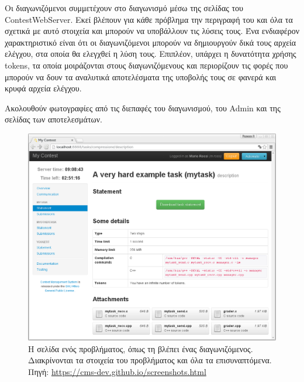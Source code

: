 \documentclass[diploma]{softlab-thesis}
\begin{document}
\bigskip

Οι διαγωνιζόμενοι συμμετέχουν στο διαγωνισμό μέσω της σελίδας του
ContestWebServer. Εκεί βλέπουν για κάθε πρόβλημα την περιγραφή του και όλα
τα σχετικά με αυτό στοιχεία και μπορούν να υποβάλλουν τις λύσεις τους. Ένα
ενδιαφέρον χαρακτηριστικό είναι ότι οι διαγωνιζόμενοι μπορούν να δημιουργούν
δικά τους αρχεία ελέγχου, στα οποία θα ελεγχθεί η λύση τους. Επιπλέον, υπάρχει
η δυνατότητα χρήσης tokens, τα οποία μοιράζονται στους διαγωνιζόμενους και
περιορίζουν τις φορές που μπορούν να δουν τα αναλυτικά αποτελέσματα της
υποβολής τους σε φανερά και κρυφά αρχεία ελέγχου.

\bigskip

Ακολουθούν φωτογραφίες από τις διεπαφές του διαγωνισμού, του Admin και της σελίδας
των αποτελεσμάτων.

\bigskip

\begin{figure}
  \centering
  \includegraphics[scale=0.4,trim=4 4 4 4,clip]{Figures/cmscontestant.png}
  \caption[Σελίδα προβλήματος CMS]{Η σελίδα ενός προβλήματος, όπως τη βλέπει ένας
  διαγωνιζόμενος. Διακρίνονται τα στοιχεία του προβλήματος και όλα τα
  επισυναπτόμενα. Πηγή: \url{https://cms-dev.github.io/screenshots.html}}
\end{figure}
\end{document}

